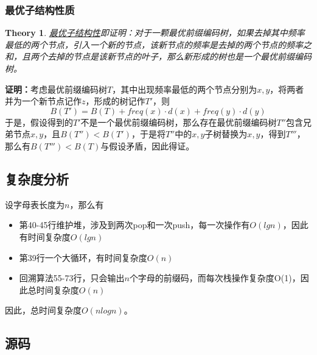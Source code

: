 \documentclass{ctexart}[UTF8]
\newtheorem{theorem}{Theory}[section]
\begin{document}
    \subsubsection{最优子结构性质}
    \begin{theorem}
        \underline{最优子结构性}即证明：对于一颗最优前缀编码树，如果去掉其中频率最低的两个节点，引入一个新的节点，该新节点的频率是去掉的两个节点的频率之和，且两个去掉的节点是该新节点的叶子，那么新形成的树也是一个最优前缀编码树。
    \end{theorem}
    \textbf{证明：}考虑最优前缀编码树$T$，其中出现频率最低的两个节点分别为$x,y$，将两者并为一个新节点记作$z$，形成的树记作$T'$，则
    \begin{equation}
        B(T') = B(T) + freq(x)\cdot d(x) + freq(y) \cdot d(y)
    \end{equation}
    于是，假设得到的$T'$不是一个最优前缀编码树，那么存在最优前缀编码树$T''$包含兄弟节点$x,y$，且$B(T'') < B(T')$，于是将$T''$中的$x,y$子树替换为$x,y$，得到$T'''$，那么有$B(T''') < B(T)$与假设矛盾，因此得证。
    \subsection{复杂度分析}
    设字母表长度为$n$，那么有\begin{itemize}
        \item 第40-45行维护堆，涉及到两次pop和一次push，每一次操作有$O(lgn)$，因此有时间复杂度$O(lgn)$
        \item 第39行一个大循环，有时间复杂度$O(n)$
        \item 回溯算法55-73行，只会输出$n$个字母的前缀码，而每次栈操作复杂度O(1)，因此总时间复杂度$O(n)$
    \end{itemize}
    \par 因此，总时间复杂度$O(nlogn)$。
    \subsection{源码}
        
\end{document}
